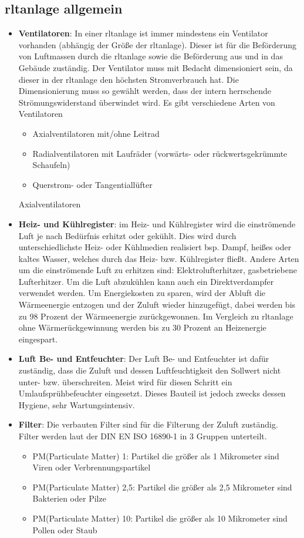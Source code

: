 \subsection{\ac{rltanlage} allgemein}
\begin{itemize}
	\item \textbf{Ventilatoren}: In einer \ac{rltanlage} ist immer mindestens ein Ventilator vorhanden (abhängig der Größe der \ac{rltanlage}). Dieser ist für die Beförderung von Luftmassen durch die \ac{rltanlage} sowie die Beförderung aus und in das Gebäude zuständig. Der Ventilator muss mit Bedacht dimensioniert sein, da dieser in der \ac{rltanlage} den höchsten Stromverbrauch hat. Die Dimensionierung muss so gewählt werden, dass der intern herrschende Strömungswiderstand überwindet wird. Es gibt verschiedene Arten von Ventilatoren 
	\begin{itemize}
		\item Axialventilatoren mit/ohne Leitrad 
		\item Radialventilatoren mit Laufräder (vorwärts- oder rückwertsgekrümmte Schaufeln)
		\item Querstrom- oder Tangentiallüfter 
	\end{itemize}
	Axialventilatoren 

	\item \textbf{Heiz- und Kühlregister}: im Heiz- und Kühlregister wird die einströmende Luft je nach Bedürfnis erhitzt oder gekühlt. Dies wird durch unterschiedlichste Heiz- oder Kühlmedien realisiert bsp. Dampf, heißes oder kaltes Wasser, welches durch das Heiz- bzw. Kühlregister fließt. Andere Arten um die einströmende Luft zu erhitzen sind: Elektrolufterhitzer, gasbetriebene Lufterhitzer. Um die Luft abzukühlen kann auch ein Direktverdampfer verwendet werden.
	Um Energiekosten zu sparen, wird der Abluft die Wärmeenergie entzogen und der Zuluft wieder hinzugefügt, dabei werden bis zu 98 Prozent der Wärmeenergie zurückgewonnen. Im Vergleich zu \ac{rltanlage} ohne Wärmerückgewinnung werden bis zu 30 Prozent an Heizenergie eingespart. 
	
	
	\item \textbf{Luft Be- und Entfeuchter}: Der Luft Be- und Entfeuchter ist dafür zuständig, dass die Zuluft und dessen Luftfeuchtigkeit den Sollwert nicht unter- bzw. überschreiten. Meist wird für diesen Schritt ein Umlaufsprühbefeuchter eingesetzt. Dieses Bauteil ist jedoch zwecks dessen Hygiene, sehr Wartungsintensiv. 
	
	\item \textbf{Filter}: Die verbauten Filter sind für die Filterung der Zuluft zuständig. Filter werden laut der DIN EN ISO 16890-1 in 3 Gruppen unterteilt.
	\begin{itemize}
		\item PM(Particulate Matter) 1: Partikel die größer als 1 Mikrometer sind \zB Viren oder Verbrennungspartikel 
		\item PM(Particulate Matter) 2,5: Partikel die größer als 2,5 Mikrometer sind \zB Bakterien oder Pilze
		\item PM(Particulate Matter) 10: Partikel die größer als 10 Mikrometer sind \zB Pollen oder Staub
	\end{itemize}
	

\end{itemize}
